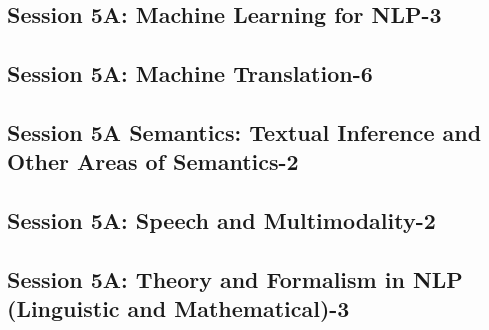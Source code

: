 \subsection{\large Session 5A: Machine Learning for NLP-3}
\label{parallel-session-5A-trackD}
\TrackDLoc\hfill\sessionchair{}{}
\clearpage
\subsection{\large Session 5A: Machine Translation-6}
\label{parallel-session-5A-trackE}
\TrackELoc\hfill\sessionchair{}{}
\clearpage
\subsection{\large Session 5A Semantics: Textual Inference and Other Areas of Semantics-2}
\label{parallel-session-5A-trackF}
\TrackFLoc\hfill\sessionchair{}{}
\clearpage
\subsection{\large Session 5A: Speech and Multimodality-2}
\label{parallel-session-5A-trackG}
\TrackGLoc\hfill\sessionchair{}{}
\clearpage
\subsection{\large Session 5A: Theory and Formalism in NLP (Linguistic and Mathematical)-3}
\label{parallel-session-5A-trackH}
\TrackHLoc\hfill\sessionchair{}{}
\clearpage


